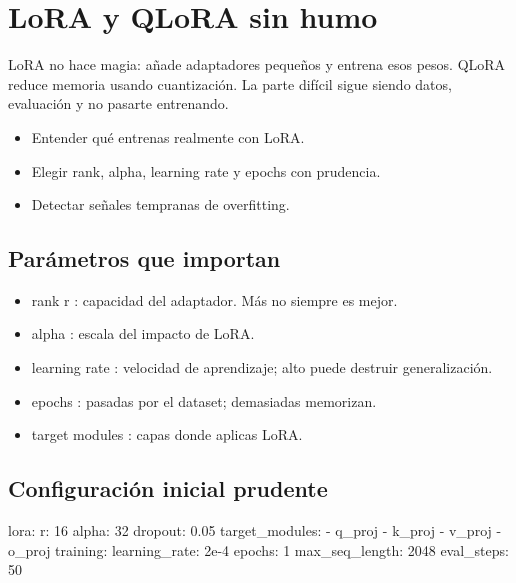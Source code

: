 \documentclass[11pt,a4paper]{book}
\begin{document}
\chapter{LoRA y QLoRA sin humo}
LoRA no hace magia: añade adaptadores pequeños y entrena esos pesos. QLoRA reduce memoria usando cuantización. La parte difícil sigue siendo datos, evaluación y no pasarte entrenando.

\begin{itemize}\item Entender qué entrenas realmente con LoRA.\end{itemize}
\begin{itemize}\item Elegir rank, alpha, learning rate y epochs con prudencia.\end{itemize}
\begin{itemize}\item Detectar señales tempranas de overfitting.\end{itemize}
\section{Parámetros que importan}
\begin{itemize}\item rank r : capacidad del adaptador. Más no siempre es mejor.\end{itemize}
\begin{itemize}\item alpha : escala del impacto de LoRA.\end{itemize}
\begin{itemize}\item learning rate : velocidad de aprendizaje; alto puede destruir generalización.\end{itemize}
\begin{itemize}\item epochs : pasadas por el dataset; demasiadas memorizan.\end{itemize}
\begin{itemize}\item target modules : capas donde aplicas LoRA.\end{itemize}
\section{Configuración inicial prudente}
\begin{codebox}
lora:
  r: 16
  alpha: 32
  dropout: 0.05
  target_modules:
    - q_proj
    - k_proj
    - v_proj
    - o_proj
training:
  learning_rate: 2e-4
  epochs: 1
  max_seq_length: 2048
  eval_steps: 50
\end{codebox}
\end{document}
